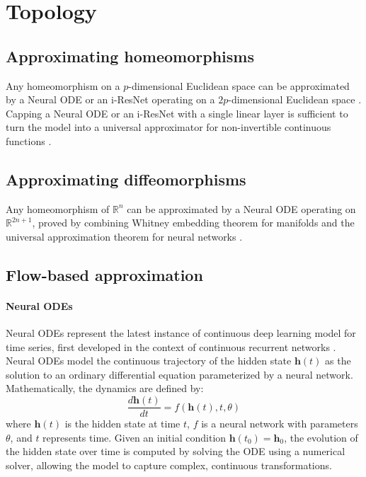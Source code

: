 \documentclass{article}
\theoremstyle{definition} \newtheorem{definition}{Definition}  \newtheorem{example}{Example}
\theoremstyle{remark} \newtheorem{remark}{Remark}
\newcounter{ct}
\begin{document}
\newpage
\appendix


\section{Topology}\label{sec:topology}

\subsection{Approximating homeomorphisms}\label{sec:homeomorphisms}
Any homeomorphism on a $p$-dimensional Euclidean space can be approximated by a Neural ODE or an i-ResNet operating on a $2p$-dimensional Euclidean space \citep{zhang2020approximation}.
%
Capping a Neural ODE or an i-ResNet with a single linear layer is sufficient to turn the model into a universal approximator for non-invertible continuous functions \citep{zhang2020approximation}.


\subsection{Approximating diffeomorphisms}\label{sec:diffeomorphisms}
Any homeomorphism of $\mathbb {R} ^{n}$ can be approximated by a Neural ODE operating on $\mathbb {R} ^{2n+1}$, proved by combining Whitney embedding theorem for manifolds and the universal approximation theorem for neural networks  \citep{zhang2020approximation}.


\subsection{Flow-based approximation}
\paragraph{Neural ODEs}
Neural ODEs \citep{chen2018neural} represent the latest instance of continuous deep learning model for time series, first developed in the context of continuous recurrent networks \citep{cohen1983absolute}.
%
Neural ODEs model the continuous trajectory of the hidden state \( \mathbf{h}(t) \) as the solution to an ordinary differential equation parameterized by a neural network. Mathematically, the dynamics are defined by:
\[
\frac{d \mathbf{h}(t)}{dt} = f(\mathbf{h}(t), t, \theta)
\]
where \( \mathbf{h}(t) \) is the hidden state at time \( t \), \( f \) is a neural network with parameters \( \theta \), and \( t \) represents time.
Given an initial condition \( \mathbf{h}(t_0) = \mathbf{h}_0 \), the evolution of the hidden state over time is computed by solving the ODE using a numerical solver, allowing the model to capture complex, continuous transformations.
\end{document}
